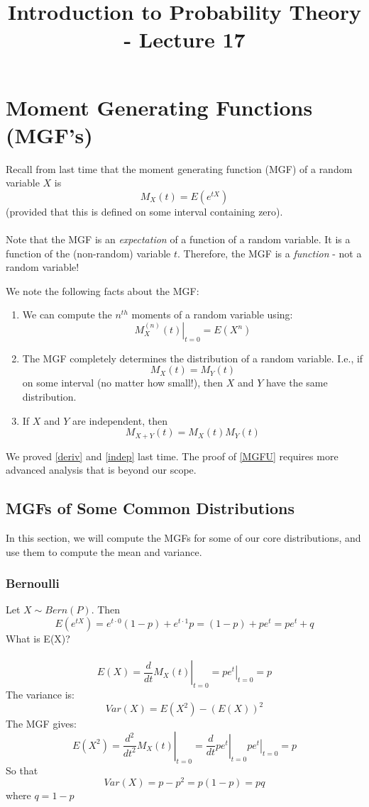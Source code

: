 \documentclass[12pt]{article} %
\date{}
\title{Introduction to Probability Theory - Lecture 17}
\begin{document}
\maketitle

\section{Moment Generating Functions (MGF's)}
Recall from last time that the moment generating function (MGF) of a random variable $X$ is
$$M_X(t) = E(e^{tX})$$
(provided that this is defined on some interval containing zero).\\\\
Note that the MGF is an \emph{expectation} of a function of a random variable. It is a function of the (non-random) variable $t$. Therefore, the MGF is a \emph{function} - not a random variable!

We note the following facts about the MGF:

\begin{enumerate}
\item \label{deriv} We can compute the $n^{th}$ moments of a random variable using:
$$\left.M_X^{(n)}(t)\right\rvert_{t=0} = E(X^n)$$

\item  \label{MGFU} The MGF completely determines the distribution of a random variable. I.e., if
$$M_X(t) = M_Y(t)$$
on some interval (no matter how small!), then $X$ and $Y$ have the same distribution.

\item \label{indep} If $X$ and $Y$ are independent, then
$$M_{X+Y}(t) = M_X(t)M_Y(t)$$  
\end{enumerate}
We proved \eqref{deriv} and \eqref{indep} last time. The proof of \eqref{MGFU} requires more advanced analysis that is beyond our scope.

\subsection{MGFs of Some Common Distributions}
In this section, we will compute the MGFs for some of our core distributions, and use them to compute the mean and variance.
\subsubsection*{Bernoulli}
Let $X\sim Bern(P)$. Then
$$E\left(e^{tX}\right) = e^{t\cdot 0}\left(1-p\right) + e^{t\cdot 1} p = (1-p) + pe^t = pe^t + q$$
What is E(X)?\\\\
$$E(X) = \left.\frac{d}{dt}M_X(t)\right\rvert_{t=0} = \left. p e^t\right\rvert_{t=0} = p$$
The variance is:
$$Var(X) = E(X^2) - \left(E(X)\right)^2$$
The MGF gives:
$$E(X^2) =  \left.\frac{d^2}{dt^2}M_X(t)\right\rvert_{t=0} =  \left.\frac{d}{dt}pe^t\right\rvert_{t=0}\left. p e^t\right\rvert_{t=0} = p$$
So that 
$$Var(X) = p - p^2 = p(1-p) = pq$$
where $q=1-p$
\end{document}
